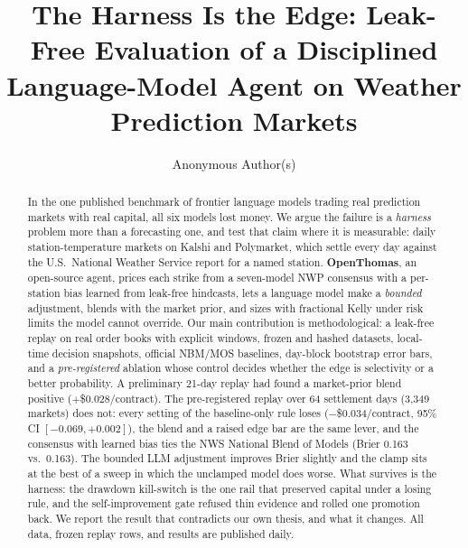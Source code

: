 \documentclass[sigconf,review,anonymous]{acmart}
\begin{document}
\title{The Harness Is the Edge: Leak-Free Evaluation of a Disciplined
Language-Model Agent on Weather Prediction Markets}

\author{Anonymous Author(s)}
\affiliation{%
  \institution{}
  \country{}
}

\begin{abstract}
In the one published benchmark of frontier language models trading real
prediction markets with real capital, all six models lost money. We argue the
failure is a \emph{harness} problem more than a forecasting one, and test that
claim where it is measurable: daily station-temperature markets on Kalshi and
Polymarket, which settle every day against the U.S.\ National Weather Service
report for a named station. \textbf{OpenThomas}, an open-source agent, prices
each strike from a seven-model NWP consensus with a per-station bias learned
from leak-free hindcasts, lets a language model make a \emph{bounded}
adjustment, blends with the market prior, and sizes with fractional Kelly under
risk limits the model cannot override. Our main contribution is methodological:
a leak-free replay on real order books with explicit windows, frozen and hashed
datasets, local-time decision snapshots, official NBM/MOS baselines, day-block
bootstrap error bars, and a \emph{pre-registered} ablation whose control
decides whether the edge is selectivity or a better probability. A preliminary
21-day replay had found a market-prior blend positive ($+$\$0.028/contract).
The pre-registered replay over 64 settlement days (3{,}349 markets) does not:
every setting of the baseline-only rule loses ($-$\$0.034/contract, 95\% CI
$[-0.069, +0.002]$), the blend and a raised edge bar are the same lever, and
the consensus with learned bias ties the NWS National Blend of Models (Brier
0.163 vs.\ 0.163). The bounded LLM adjustment improves Brier slightly and the
clamp sits at the best of a sweep in which the unclamped model does worse. What
survives is the harness: the drawdown kill-switch is the one rail that
preserved capital under a losing rule, and the self-improvement gate refused
thin evidence and rolled one promotion back. We report the result that
contradicts our own thesis, and what it changes. All data, frozen replay rows,
and results are published daily.
\end{abstract}


\maketitle
\end{document}
